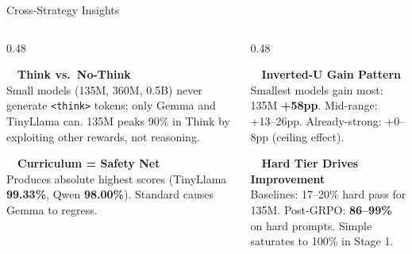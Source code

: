 \documentclass[10pt, aspectratio=169]{beamer}
\begin{document}
\begin{frame}{Cross-Strategy Insights}
  \begin{columns}[T]
    \begin{column}{0.48\textwidth}
      \begin{tcolorbox}[insightbox=sky]
        \textcolor{sky}{\faBrain}~~\textbf{\color{sky}Think vs.\ No-Think}\\[4pt]
        \scriptsize Small models (135M, 360M, 0.5B) never generate \texttt{<think>} tokens;
        only Gemma and TinyLlama can.
        135M peaks 90\% in Think by exploiting other rewards, not reasoning.
      \end{tcolorbox}
      \vspace{0.5em}
      \begin{tcolorbox}[insightbox=accent]
        \textcolor{accent}{\faLock}~~\textbf{\color{accent}Curriculum = Safety Net}\\[4pt]
        \scriptsize Produces absolute highest scores (TinyLlama \textbf{99.33\%}, Qwen \textbf{98.00\%}).
        Standard causes Gemma to regress.
      \end{tcolorbox}
    \end{column}
    \begin{column}{0.48\textwidth}
      \begin{tcolorbox}[insightbox=gold]
        \textcolor{gold}{\faChartArea}~~\textbf{\color{gold}Inverted-U Gain Pattern}\\[4pt]
        \scriptsize Smallest models gain most: 135M \textbf{+58pp}.
        Mid-range: +13--26pp.
        Already-strong: +0--8pp (ceiling effect).
      \end{tcolorbox}
      \vspace{0.5em}
      \begin{tcolorbox}[insightbox=warn]
        \textcolor{warn}{\faExclamationTriangle}~~\textbf{\color{warn}Hard Tier Drives Improvement}\\[4pt]
        \scriptsize Baselines: 17--20\% hard pass for 135M.
        Post-GRPO: \textbf{86--99\%} on hard prompts.
        Simple saturates to 100\% in Stage 1.
      \end{tcolorbox}
    \end{column}
  \end{columns}
\end{frame}
\end{document}
